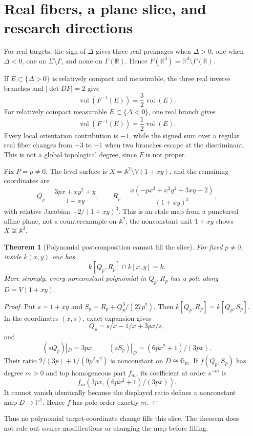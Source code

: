 \documentclass[11pt]{article}
\newtheorem{theorem}{Theorem}[section]
\theoremstyle{remark}
\newcommand{\A}{\mathbb A}
\newcommand{\R}{\mathbb R}
\begin{document}
\section{Real fibers, a plane slice, and research directions}

For real targets, the sign of $\Delta$ gives three real preimages when
$\Delta>0$, one when $\Delta<0$, one on $\Sigma\setminus\Gamma$, and none on
$\Gamma(\R)$. Hence $F(\R^3)=\R^3\setminus\Gamma(\R)$.

If $E\subset\{\Delta>0\}$ is relatively compact and measurable, the three
real inverse branches and $|\det DF|=2$ give
\[
\operatorname{vol}(F^{-1}(E))=\frac32\operatorname{vol}(E).
\]
For relatively compact measurable $E\subset\{\Delta<0\}$, one real branch
gives
\[
\operatorname{vol}(F^{-1}(E))=\frac12\operatorname{vol}(E).
\]
Every local orientation contribution is $-1$, while the signed sum over a
regular real fiber changes from $-3$ to $-1$ when two branches escape at the
discriminant. This is not a global topological degree, since $F$ is not
proper.

Fix $P=p\neq0$. The level surface is
$X=\A^2\setminus V(1+xy)$, and the remaining coordinates are
\[
Q_p=\frac{3px+xy^2+y}{1+xy},\qquad
R_p=\frac{x(-px^2+x^2y^2+3xy+2)}{(1+xy)^3},
\]
with relative Jacobian $-2/(1+xy)^3$. This is an etale map from a punctured
affine plane, not a counterexample on $\A^2$; the nonconstant unit $1+xy$
shows $X\not\cong\A^2$.

\begin{theorem}[Polynomial postcomposition cannot fill the slice]
For fixed $p\ne0$, inside $k(x,y)$ one has
\[
k[Q_p,R_p]\cap k[x,y]=k.
\]
More strongly, every nonconstant polynomial in $Q_p,R_p$ has a pole along
$D=V(1+xy)$.
\end{theorem}
\begin{proof}
Put $s=1+xy$ and
$S_p=R_p+Q_p^3/(27p^2)$. Then
$k[Q_p,R_p]=k[Q_p,S_p]$. In the coordinates $(x,s)$, exact expansion gives
\[
Q_p=s/x-1/x+3px/s,
\]
and
\[
(sQ_p)|_D=3px,\qquad
(sS_p)|_D=(6px^2+1)/(3px).
\]
Their ratio $2/(3p)+1/(9p^2x^2)$ is nonconstant on
$D\cong\mathbb G_m$. If $f(Q_p,S_p)$ has degree $m>0$ and top homogeneous
part $f_m$, its coefficient at order $s^{-m}$ is
\[
f_m\left(3px,(6px^2+1)/(3px)\right).
\]
It cannot vanish identically because the displayed ratio defines a
nonconstant map $D\to\mathbb P^1$. Hence $f$ has pole order exactly $m$.
\end{proof}

Thus no polynomial target-coordinate change fills this slice. The theorem
does not rule out source modifications or changing the map before filling.
\end{document}
